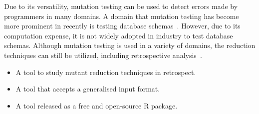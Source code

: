 Due to its versatility, mutation testing can be used to detect errors made by programmers in many domains.  A domain
that mutation testing has become more prominent in recently is testing database schemas~\cite{mcminn2016virtual,
mcminn2015effectiveness, wright2013efficient}. However, due to its computation expense, it is not widely adopted in
industry to test database schemas.  Although mutation testing is used in a variety of domains, the reduction techniques
can still be utilized, including retrospective analysis~\cite{jia2011analysis, wong1995reducing, offutt1993experimental,
offutt2001mutation}.

    \begin{itemize}
        \item A tool to study mutant reduction techniques in retrospect.
        \item A tool that accepts a generalised input format.
        \item A tool released as a free and open-source R package.
    \end{itemize}
